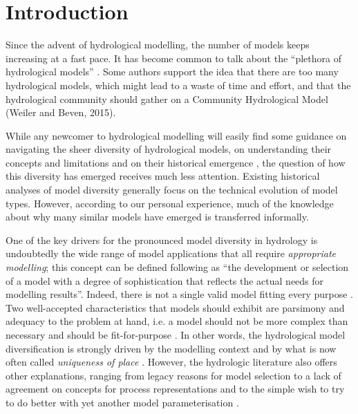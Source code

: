 \documentclass[10pt,a4paper]{article}
\begin{document}
\section{Introduction}
\label{sec:intro}

Since the advent of hydrological modelling, the number of models keeps increasing at a fast pace. It has become common to talk about the ``plethora of hydrological models'' \citep{Clark2011a}. Some authors support the idea that there are too many hydrological models, which might lead to a waste of time and effort, and that the hydrological community should gather on a Community Hydrological Model (Weiler and Beven, 2015).

While any newcomer to hydrological modelling will easily find some guidance on navigating the sheer diversity of hydrological models, on understanding their concepts and limitations \citep{Beven2013, Solomatine2011, Kauffeldt2016} and on their historical emergence \citep{Beven2020, Beven2020a}, the question of how this diversity has emerged receives much less attention. Existing historical analyses of model diversity \citep{Peel2020} generally focus on the technical evolution of model types. However, according to our personal experience, much of the knowledge about why many similar models have emerged is transferred informally.

One of the key drivers for the pronounced model diversity in hydrology is undoubtedly the wide range of model applications \citep{Weiler2015} that all require \textit{appropriate modelling}; this concept can be defined following \citet{Rosbjerg2005} as ``the development or selection of a model with a degree of sophistication that reflects the actual needs for modelling results''. Indeed, there is not a single valid model fitting every purpose \citep{Hamalainen2015}. Two well-accepted characteristics that models should exhibit are parsimony and adequacy to the problem at hand, i.e. a model should not be more complex than necessary and should be fit-for-purpose \citep{Beven2013}. In other words, the hydrological model diversification is strongly driven by the modelling context and by what is now often called \textit{uniqueness of place} \citep{Beven2000}. However, the hydrologic literature also offers other explanations, ranging from legacy reasons for model selection \citep{Addor2019} to a lack of agreement on concepts for process representations and to the simple wish to try to do better with yet another model parameterisation \citep{Weiler2015}.
\end{document}

